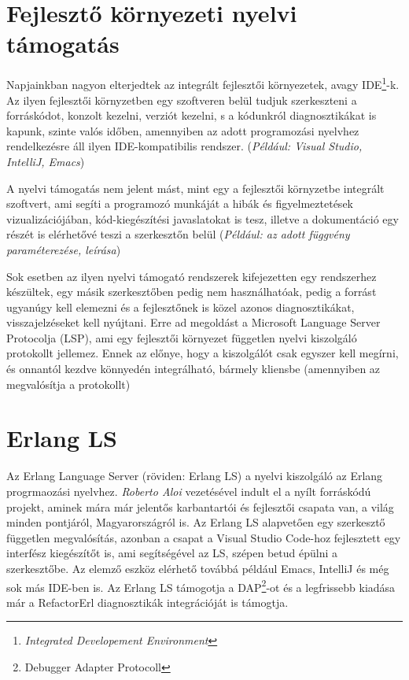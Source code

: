 \section{Fejlesztő környezeti nyelvi támogatás}
Napjainkban nagyon elterjedtek az integrált fejlesztői környezetek, avagy IDE\footnote{\textit{Integrated Developement Environment}}-k. Az ilyen fejlesztői környzetben egy szoftveren belül tudjuk szerkeszteni a forráskódot, konzolt kezelni, verziót kezelni, s a kódunkról diagnosztikákat is kapunk, szinte valós időben, amennyiben az adott programozási nyelvhez rendelkezésre áll ilyen IDE-kompatibilis rendszer. (\textit{Például: Visual Studio, IntelliJ, Emacs})

A nyelvi támogatás nem jelent mást, mint egy a fejlesztői környzetbe integrált szoftvert, ami segíti a programozó munkáját a hibák és figyelmeztetések vizualizációjában, kód-kiegészítési javaslatokat is tesz, illetve a dokumentáció egy részét is elérhetővé teszi a szerkesztőn belül (\textit{Például: az adott függvény paraméterezése, leírása})

Sok esetben az ilyen nyelvi támogató rendszerek kifejezetten egy rendszerhez készültek, egy másik szerkesztőben pedig nem használhatóak, pedig a forrást ugyanúgy kell elemezni és a fejlesztőnek is közel azonos diagnosztikákat, visszajelzéseket kell nyújtani. Erre ad megoldást a Microsoft Language Server Protocolja (LSP), ami egy fejlesztői környezet független nyelvi kiszolgáló protokollt jellemez. Ennek az előnye, hogy a kiszolgálót csak egyszer kell megírni, és onnantól kezdve könnyedén integrálható, bármely kliensbe (amennyiben az megvalósítja a protokollt)

\section{Erlang LS}
Az Erlang Language Server (röviden: Erlang LS) a nyelvi kiszolgáló az Erlang progrmaozási nyelvhez. \textit{Roberto Aloi} vezetésével indult el a nyílt forráskódú projekt, aminek mára már jelentős karbantartói és fejlesztői csapata van, a világ minden pontjáról, Magyarországról is. Az Erlang LS alapvetően egy szerkesztő független megvalósítás, azonban a csapat a Visual Studio Code-hoz fejlesztett egy interfész kiegészítőt is, ami segítségével az LS, szépen betud épülni a szerkesztőbe. Az elemző eszköz elérhető továbbá például Emacs, IntelliJ és még sok más IDE-ben is. Az Erlang LS támogotja a DAP\footnote{Debugger Adapter Protocoll}-ot és a legfrissebb kiadása már a RefactorErl diagnosztikák integrációját is támogtja.

